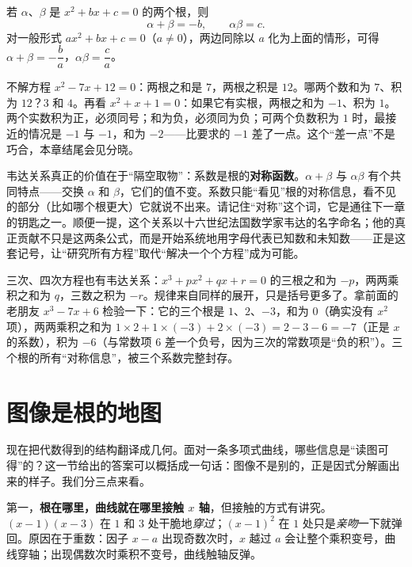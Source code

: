 \begin{dingli}
若 $\alpha$、$\beta$ 是 $x^2+bx+c=0$ 的两个根，则
\[
\alpha+\beta = -b, \qquad \alpha\beta = c.
\]
对一般形式 $ax^2+bx+c=0$（$a\neq 0$），两边同除以 $a$ 化为上面的情形，可得 $\alpha+\beta=-\dfrac{b}{a}$，$\alpha\beta=\dfrac{c}{a}$。
\end{dingli}

\begin{li}
不解方程 $x^2-7x+12=0$：两根之和是 $7$，两根之积是 $12$。哪两个数和为 $7$、积为 $12$？$3$ 和 $4$。再看 $x^2+x+1=0$：如果它有实根，两根之和为 $-1$、积为 $1$。两个实数积为正，必须同号；和为负，必须同为负；可两个负数积为 $1$ 时，最接近的情况是 $-1$ 与 $-1$，和为 $-2$——比要求的 $-1$ 差了一点。这个“差一点”不是巧合，本章结尾会见分晓。
\end{li}

韦达关系真正的价值在于“隔空取物”：系数是根的\textbf{对称函数}。$\alpha+\beta$ 与 $\alpha\beta$ 有个共同特点——交换 $\alpha$ 和 $\beta$，它们的值不变。系数只能“看见”根的对称信息，看不见的部分（比如哪个根更大）它就说不出来。请记住“对称”这个词，它是通往下一章的钥匙之一。顺便一提，这个关系以十六世纪法国数学家韦达的名字命名；他的真正贡献不只是这两条公式，而是开始系统地用字母代表已知数和未知数——正是这套记号，让“研究所有方程”取代“解决一个个方程”成为可能。

三次、四次方程也有韦达关系：$x^3+px^2+qx+r=0$ 的三根之和为 $-p$，两两乘积之和为 $q$，三数之积为 $-r$。规律来自同样的展开，只是括号更多了。拿前面的老朋友 $x^3-7x+6$ 检验一下：它的三个根是 $1$、$2$、$-3$，和为 $0$（确实没有 $x^2$ 项），两两乘积之和为 $1\times 2+1\times(-3)+2\times(-3)=2-3-6=-7$（正是 $x$ 的系数），积为 $-6$（与常数项 $6$ 差一个负号，因为三次的常数项是“负的积”）。三个根的所有“对称信息”，被三个系数完整封存。

\section{图像是根的地图}

现在把代数得到的结构翻译成几何。面对一条多项式曲线，哪些信息是“读图可得”的？这一节给出的答案可以概括成一句话：图像不是别的，正是因式分解画出来的样子。我们分三点来看。

第一，\textbf{根在哪里，曲线就在哪里接触 $x$ 轴}，但接触的方式有讲究。$(x-1)(x-3)$ 在 $1$ 和 $3$ 处干脆地\emph{穿过}；$(x-1)^2$ 在 $1$ 处只是\emph{亲吻}一下就弹回。原因在于重数：因子 $x-a$ 出现奇数次时，$x$ 越过 $a$ 会让整个乘积变号，曲线穿轴；出现偶数次时乘积不变号，曲线触轴反弹。

\begin{center}
\end{center}

